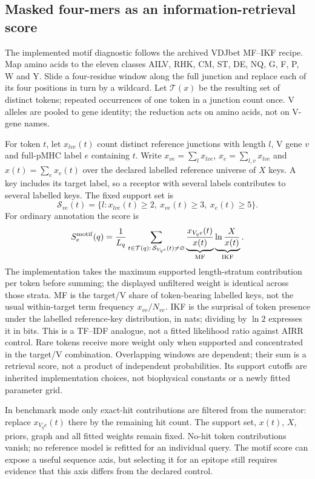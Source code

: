 \documentclass[10pt,a4paper]{article}
\theoremstyle{definition}
\begin{document}
\subsection{Masked four-mers as an information-retrieval score}
The implemented motif diagnostic follows the archived VDJbet MF--IKF recipe.
Map amino acids to the eleven classes AILV, RHK, CM, ST, DE, NQ, G, F, P, W and Y.
Slide a four-residue window along the full junction and replace each of its four positions in turn by a wildcard.
Let $\mathcal T(x)$ be the resulting set of distinct tokens; repeated occurrences of one token in a junction count once.
V alleles are pooled to gene identity; the reduction acts on amino acids, not on V-gene names.

For token $t$, let $x_{lve}(t)$ count distinct reference junctions with length $l$, V gene $v$ and full-pMHC label $e$ containing $t$.
Write $x_{ve}=\sum_lx_{lve}$, $x_e=\sum_{l,v}x_{lve}$ and $x(t)=\sum_e x_e(t)$ over the declared labelled reference universe of $X$ keys.
A key includes its target label, so a receptor with several labels contributes to several labelled keys.
The fixed support set is
\[
 \mathcal S_{ve}(t)=\{l:x_{lve}(t)\ge2,\ x_{ve}(t)\ge3,\ x_e(t)\ge5\}.
\]
For ordinary annotation the score is
\begin{equation}
 S_e^{\rm motif}(q)=\frac{1}{L_q}
 \sum_{t\in\mathcal T(q):\,\mathcal S_{V_qe}(t)\ne\varnothing}
 \underbrace{\frac{x_{V_qe}(t)}{x(t)}}_{\mathrm{MF}}
 \underbrace{\ln\frac{X}{x(t)}}_{\mathrm{IKF}}.
 \label{eq:selection-motif}
\end{equation}
The implementation takes the maximum supported length-stratum contribution per token before summing; the displayed unfiltered weight is identical across those strata.
MF is the target/V share of token-bearing labelled keys, not the usual within-target term frequency $x_{ve}/N_{ve}$.
IKF is the surprisal of token presence under the labelled reference-key distribution, in nats; dividing by $\ln2$ expresses it in bits.
This is a TF--IDF analogue, not a fitted likelihood ratio against AIRR control.
Rare tokens receive more weight only when supported and concentrated in the target/V combination.
Overlapping windows are dependent; their sum is a retrieval score, not a product of independent probabilities.
Its support cutoffs are inherited implementation choices, not biophysical constants or a newly fitted parameter grid.

In benchmark mode only exact-hit contributions are filtered from the numerator: replace $x_{V_qe}(t)$ there by the remaining hit count.
The support set, $x(t)$, $X$, priors, graph and all fitted weights remain fixed.
No-hit token contributions vanish; no reference model is refitted for an individual query.
The motif score can expose a useful sequence axis, but selecting it for an epitope still requires evidence that this axis differs from the declared control.
\end{document}
